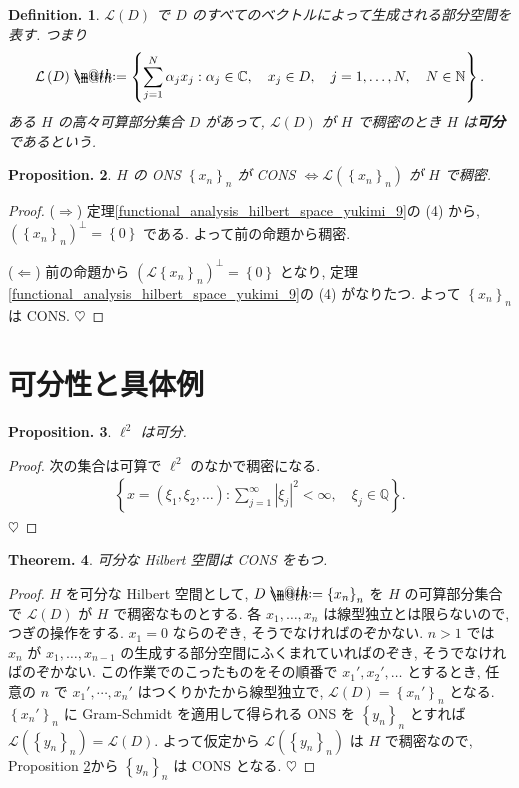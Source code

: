 \documentclass[openany, a4paper, oneside]{book}
\makeatletter
\newcommand*{\defeq}{\mathrel{\rlap{%
\raisebox{0.3ex}{$\m@th\cdot$}}%
\raisebox{-0.3ex}{$\m@th\cdot$}}%
=}
\theoremstyle{break}
\newtheorem{thm}{Theorem.}[section]
\newtheorem{prop}[thm]{Proposition.}
\theoremstyle{breakdefn}
\newtheorem{defn}[thm]{Definition.}
\newcommand{\abs}[1]{\left|#1\right|}
\newcommand{\rbk}[1]{\left (#1\right)}
\newcommand{\cbk}[1]{\left\{#1\right\}}
\newcommand{\set}[2]{\left\{#1 : #2\right\}}
\newcommand{\bbC}{\mathbb{C}}
\newcommand{\bbN}{\mathbb{N}}
\newcommand{\bbQ}{\mathbb{Q}}
\newcommand{\calL}{\mathcal{L}}
\newcommand{\upbf}[1]{\textup{\textbf{#1}}}
\makeatother
\begin{document}
\begin{defn}
 $\mathcal{L}(D)$ で $D$ のすべてのベクトルによって生成される部分空間を表す.
 つまり
 \begin{align}
  \calL \rbk{D}
  \defeq
  \set{\sum_{j=1}^N \alpha_j x_j}{\alpha_j \in \bbC, \quad x_j \in D, \quad j = 1, \dots, N, \quad N \in \bbN}.
 \end{align}
 ある $H$ の高々可算部分集合 $D$ があって, $\calL (D)$ が $H$ で稠密のとき $H$ は\upbf{可分}であるという.
\end{defn}

\begin{prop}\label{functional_analysis_hilbert_space_yukimi_10}
 $H$ の ONS $\cbk{x_n}_n$ が CONS $\Longleftrightarrow \calL(\cbk{x_n}_n)$ が $H$ で稠密.
\end{prop}
\begin{proof}
($\Longrightarrow$)
定理\ref{functional_analysis_hilbert_space_yukimi_9}の (4) から,
$(\cbk{x_n}_n)^\perp = \cbk{0}$ である.
よって前の命題から稠密.

($\Longleftarrow$)
前の命題から $(\calL \cbk{x_n}_n)^\perp = \cbk{0}$ となり,
定理 \ref{functional_analysis_hilbert_space_yukimi_9}の (4) がなりたつ.
よって $\cbk{x_n}_n$ は CONS.
$\heartsuit$
\end{proof}
\section{可分性と具体例}
\label{sec-7-13-5}

\begin{prop}
 $\ell^2$ は可分.
\end{prop}
\begin{proof}
次の集合は可算で $\ell^2$ のなかで稠密になる.
\begin{align}
 \set{x = \rbk{\xi_1, \xi_2, \dots}}{\sum_{j=1}^{\infty} \abs{\xi_j}^2 < \infty, \quad \xi_j \in \bbQ}.
\end{align}
$\heartsuit$
\end{proof}

\begin{thm}
 可分な Hilbert 空間は CONS をもつ.
\end{thm}
\begin{proof}
$H$ を可分な Hilbert 空間として, $D \defeq \cbk{x_n}_n$ を $H$ の可算部分集合で
$\calL (D)$ が $H$ で稠密なものとする.
各 $x_1, \dots, x_n$ は線型独立とは限らないので, つぎの操作をする.
$x_1 = 0$ ならのぞき, そうでなければのぞかない.
$n > 1$ では $x_n$ が $x_1, \dots, x_{n-1}$ の生成する部分空間にふくまれていればのぞき, そうでなければのぞかない.
この作業でのこったものをその順番で $x_{1}', x_{2}', \dots$ とするとき,
任意の $n$ で $x_{1}', \cdots, x_{n}'$ はつくりかたから線型独立で,
$\calL(D) = \cbk{x_{n}'}_{n}$ となる.
$\cbk{x_n'}_n$ に Gram-Schmidt を適用して得られる ONS を $\cbk{y_n}_n$ とすれば
$\calL(\cbk{y_n}_n) = \calL (D)$.
よって仮定から $\calL (\cbk{y_n}_n)$ は $H$ で稠密なので,
Proposition \ref{functional_analysis_hilbert_space_yukimi_10}から $\cbk{y_n}_n$ は CONS となる.
$\heartsuit$
\end{proof}
\end{document}

